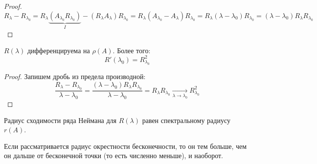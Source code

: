 \begin{proof}
	\[
		R_\lambda - R_{\lambda_0} = R_\lambda \underbrace{(A_{\lambda_0} R_{\lambda_0})}_{I} - (R_\lambda A_\lambda) R_{\lambda_0} = R_\lambda (A_{\lambda_0} - A_\lambda)R_{\lambda_0} = R_\lambda (\lambda - \lambda_0)R_{\lambda_0} = (\lambda - \lambda_0)R_\lambda R_{\lambda_0}
	\]
\end{proof}

\begin{proposition}
	$R(\lambda)$ дифференцируема на $\rho(A)$. Более того:
	\[
		R'(\lambda_0) = R_{\lambda_0}^2
	\]
\end{proposition}

\begin{proof}
	Запишем дробь из предела производной:
	\[
		\frac{R_\lambda - R_{\lambda_0}}{\lambda - \lambda_0} = \frac{(\lambda - \lambda_0)R_\lambda R_{\lambda_0}}{\lambda - \lambda_0} = R_\lambda R_{\lambda_0} \xrightarrow[\lambda \to \lambda_0]{} R_{\lambda_0}^2
	\]
\end{proof}

\begin{proposition}
	Радиус сходимости ряда Неймана для $R(\lambda)$ равен спектральному радиусу $r(A)$.
\end{proposition}

\begin{anote}
	Если рассматривается радиус окрестности бесконечности, то он тем больше, чем он дальше от бесконечной точки (то есть численно меньше), и наоборот. 
\end{anote}

